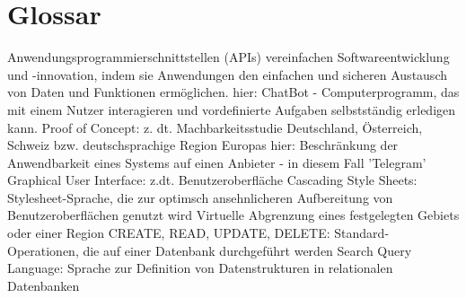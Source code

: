 \chapter{Glossar}

		        {Anwendungsprogrammierschnittstellen (APIs) vereinfachen Softwareentwicklung und -innovation, indem sie Anwendungen den einfachen und sicheren Austausch von Daten und Funktionen ermöglichen. \cite{apiIBM2020}}
			    {hier: ChatBot - Computerprogramm, das mit einem Nutzer interagieren und vordefinierte Aufgaben selbstständig erledigen kann.}
			    {Proof of Concept: z. dt. Machbarkeitsstudie}
	            {Deutschland, Österreich, Schweiz bzw. deutschsprachige Region Europas}
	{hier: Beschränkung der Anwendbarkeit eines Systems auf einen Anbieter - in diesem Fall 'Telegram'}
			    {Graphical User Interface: z.dt. Benutzeroberfläche}
              {Cascading Style Sheets: Stylesheet-Sprache, die zur optimsch ansehnlicheren Aufbereitung von Benutzeroberflächen genutzt wird}
      {Virtuelle Abgrenzung eines festgelegten Gebiets oder einer Region}
             {CREATE, READ, UPDATE, DELETE: Standard-Operationen, die auf einer Datenbank durchgeführt werden}
              {Search Query Language:  Sprache zur Definition von Datenstrukturen in relationalen Datenbanken}

